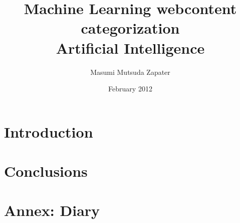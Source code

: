 \documentclass[a4paper , titlepage]{report}
\author{Masumi Mutsuda Zapater}
\title{Machine Learning webcontent categorization \\ Artificial Intelligence}
\date{February 2012}
\begin{document}
\maketitle



\tableofcontents

\newpage

\chapter{Introduction}



\chapter{Conclusions}
%



\chapter{Annex: Diary }

\end{document}
